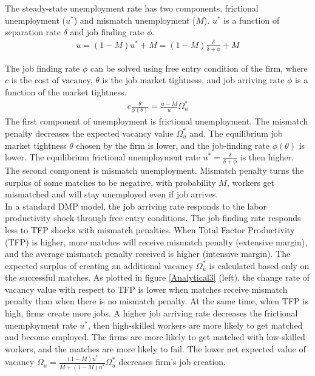 \documentclass[12pt]{article}
\newcommand{\1}{\mathbb{1}}
\begin{document}
The steady-state unemployment rate has two components, frictional unemployment ($u^*$) and mismatch unemployment ($M$). $u^*$ is a function of separation rate $\delta$ and job finding rate $\phi$. 
\begin{align}
\label{eqn:unemployment}
u = (1-M)u^*+M =  (1-M)\frac{\delta}{\delta+\phi}+M
\end{align}

The job finding rate $\phi$ can be solved using free entry condition of the firm, where $c$ is the cost of vacancy, $\theta$ is the job market tightness, and job arriving rate $\phi$ is a function of the market tightness. 
\begin{align*}
c\frac{\theta}{\phi(\theta)} = \frac{u-M}{u}\Omega_u^*
\end{align*}
The first component of unemployment is frictional unemployment. The mismatch penalty decreases the expected vacancy value $\Omega_u^*$ and.  The equilibrium job market tightness $\theta$ chosen by the firm is lower, and the job-finding rate $\phi(\theta)$ is lower. The equilibrium frictional unemployment rate $u^* =\frac{\delta}{\delta+\phi}$ is then higher. \\

The second component is mismatch unemployment. Mismatch penalty turns the surplus of some matches to be negative, with probability $M$, workers get mismatched and will stay unemployed even if job arrives.  \\

In a standard DMP model, the job arriving rate responds to the labor productivity shock through free entry conditions. The job-finding rate responds less to TFP shocks with mismatch penalties. When Total Factor Productivity (TFP) is higher, more matches will receive mismatch penalty (extensive margin), and the average mismatch penalty received is higher (intensive margin).  The expected surplus of creating an additional vacancy $\Omega_u^*$ is calculated based only on the successful matches. As plotted in figure \ref{Analytical3} (left), the change rate of vacancy value with respect to TFP is lower when matches receive mismatch penalty than when there is no mismatch penalty. At the same time, when TFP is high, firms create more jobs. A higher job arriving rate decreases the frictional unemployment rate $u^*$, then high-skilled workers are more likely to get matched and become employed. The firms are more likely to get matched with low-skilled workers, and the matches are more likely to fail. The lower net expected value of vacancy $\Omega_u = \frac{(1-M)u^*}{M + (1-M)u^*}\Omega_u^*$ decreases firm's job creation. \\
\end{document}
